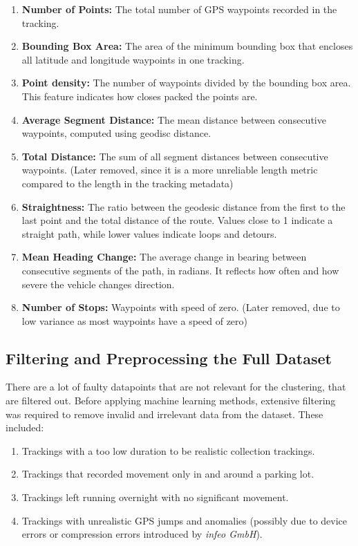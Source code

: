 \documentclass[a4paper,12pt,twoside]{scrreprt}
\begin{document}
\begin{enumerate}
  \item \textbf{Number of Points:} The total number of GPS waypoints recorded
        in the tracking.
  \item \textbf{Bounding Box Area:} The area of the minimum bounding box that
        encloses all latitude and longitude waypoints in one tracking.
  \item \textbf{Point density:} The number of waypoints divided by the bounding
        box area. This feature indicates how closes packed the points are.
  \item \textbf{Average Segment Distance:} The mean distance between
        consecutive waypoints, computed using geodisc distance.
  \item \textbf{Total Distance:} The sum of all segment distances between
        consecutive waypoints. (Later removed, since it is a more unreliable
        length
        metric compared to the length in the tracking metadata)
  \item \textbf{Straightness:} The ratio between the geodesic distance from the
        first to the last point and the total distance of the route. Values
        close to 1
        indicate a straight path, while lower values indicate loops and
        detours.
  \item \textbf{Mean Heading Change:} The average change in bearing between
        consecutive segments of the path, in radians. It reflects how often and
        how
        severe the vehicle changes direction.
  \item \textbf{Number of Stops:} Waypoints with speed of zero. (Later removed,
        due to low variance as most waypoints have a speed of zero)
\end{enumerate}

\subsection{Filtering and Preprocessing the Full Dataset}
There are a lot of faulty datapoints that are not relevant for the
clustering, that are filtered out. Before applying machine learning methods,
extensive filtering was required to
remove invalid and irrelevant data from the dataset. These included:

\begin{enumerate}
  \item Trackings with a too low duration to be realistic collection trackings.

  \item Trackings that recorded movement only in and around a parking lot.
  \item Trackings left running overnight with no significant movement.
  \item Trackings with unrealistic GPS jumps and anomalies (possibly due to
        device errors or compression errors introduced by \textit{infeo GmbH}).
\end{enumerate}
\end{document}
